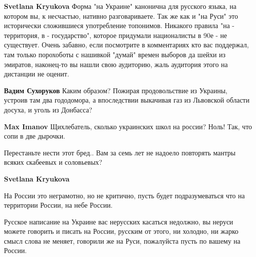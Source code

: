 \begin{itemize}
\begin{itemize}
\textbf{Svetlana Kryukova} Форма "на Украине" канонична для русского языка, на котором вы, к несчастью, нативно разговариваете. Так же как и "на Руси" это исторически сложившиеся употребление топонимов. Никакого правила "на - территория, в - государство", которое придумали националисты в 90е - не существует. Очень забавно, если посмотрите в комментариях кто вас поддержал, там только порохоботы с нашивкой "думай" времен выборов да шейхи из эмиратов, наконец-то вы нашли свою аудиторию, жаль аудитория этого на дистанции не оценит.

 
\textbf{Вадим Сухоруков} Каким образом? Пожирая продовольствие из Украины, устроив там два гододомора, а впоследствии выкачивая газ из Львовской области досуха, и уголь из Донбасса?

 
\textbf{Max Imanov} Щихлебатель, сколько украинских школ на россии? Ноль! Так, что сопи в две дырочки.

 
Перестаньте нести этот бред.. Вам за семь лет не надоело повторять мантры всяких скабеевых и соловьевых?

 
\textbf{Svetlana Kryukova} 

На России это неграмотно, но не критично, пусть будет подразумеваться что на
территории России, на небе России. 

Русское написание на Украине вас нерусских касаться недолжно, вы неруси можете
говорить и писать на России, русским от этого, ни холодно, ни жарко смысл слова
не меняет, говорили же на Руси, пожалуйста пусть по вашему на России. 


\end{itemize}
\end{itemize}
